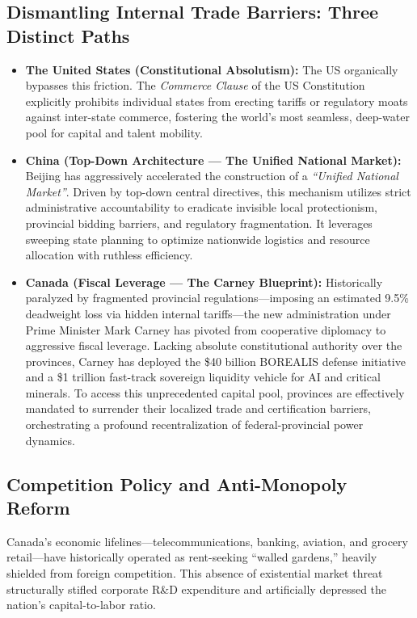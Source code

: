 \documentclass[11pt,a4paper]{article}
\begin{document}
\subsection{Dismantling Internal Trade Barriers: Three Distinct Paths}
\begin{itemize}[leftmargin=1.5em, itemsep=0.5em]
    \item \textbf{The United States (Constitutional Absolutism):} The US organically bypasses this friction. The \textit{Commerce Clause} of the US Constitution explicitly prohibits individual states from erecting tariffs or regulatory moats against inter-state commerce, fostering the world's most seamless, deep-water pool for capital and talent mobility.
    
    \item \textbf{China (Top-Down Architecture — The Unified National Market):} Beijing has aggressively accelerated the construction of a \textit{``Unified National Market''}. Driven by top-down central directives, this mechanism utilizes strict administrative accountability to eradicate invisible local protectionism, provincial bidding barriers, and regulatory fragmentation. It leverages sweeping state planning to optimize nationwide logistics and resource allocation with ruthless efficiency.
    
    \item \textbf{Canada (Fiscal Leverage — The Carney Blueprint):} Historically paralyzed by fragmented provincial regulations---imposing an estimated 9.5\% deadweight loss via hidden internal tariffs---the new administration under Prime Minister Mark Carney has pivoted from cooperative diplomacy to aggressive fiscal leverage. Lacking absolute constitutional authority over the provinces, Carney has deployed the \$40 billion BOREALIS defense initiative and a \$1 trillion fast-track sovereign liquidity vehicle for AI and critical minerals. To access this unprecedented capital pool, provinces are effectively mandated to surrender their localized trade and certification barriers, orchestrating a profound recentralization of federal-provincial power dynamics.
\end{itemize}

\subsection{Competition Policy and Anti-Monopoly Reform}
Canada’s economic lifelines---telecommunications, banking, aviation, and grocery retail---have historically operated as rent-seeking ``walled gardens,'' heavily shielded from foreign competition. This absence of existential market threat structurally stifled corporate R\&D expenditure and artificially depressed the nation's capital-to-labor ratio.
\end{document}
